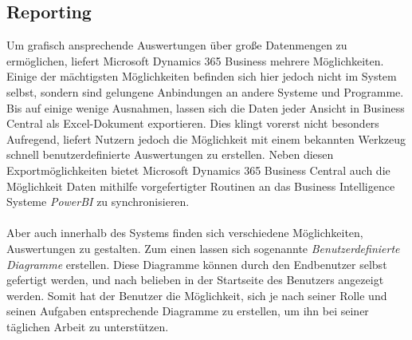 \subsection{Reporting}
Um grafisch ansprechende Auswertungen über große Datenmengen zu ermöglichen, liefert Microsoft Dynamics 365 Business mehrere Möglichkeiten. Einige der mächtigsten Möglichkeiten befinden sich hier jedoch nicht im System selbst, sondern sind gelungene Anbindungen an andere Systeme und Programme. Bis auf einige wenige Ausnahmen, lassen sich die Daten jeder Ansicht in Business Central als Excel-Dokument exportieren. Dies klingt vorerst nicht besonders Aufregend, liefert Nutzern jedoch die Möglichkeit mit einem bekannten Werkzeug schnell benutzerdefinierte Auswertungen zu erstellen. Neben diesen Exportmöglichkeiten bietet Microsoft Dynamics 365 Business Central auch die Möglichkeit Daten mithilfe vorgefertigter Routinen an das Business Intelligence Systeme \textit{PowerBI} zu synchronisieren. 
\paragraph{}

Aber auch innerhalb des Systems finden sich verschiedene Möglichkeiten, Auswertungen zu gestalten. Zum einen lassen sich sogenannte \textit{Benutzerdefinierte Diagramme} erstellen. Diese Diagramme können durch den Endbenutzer selbst gefertigt werden, und nach belieben in der Startseite des Benutzers angezeigt werden. Somit hat der Benutzer die Möglichkeit, sich je nach seiner Rolle und seinen Aufgaben entsprechende Diagramme zu erstellen, um ihn bei seiner täglichen Arbeit zu unterstützen. 
\paragraph{}

